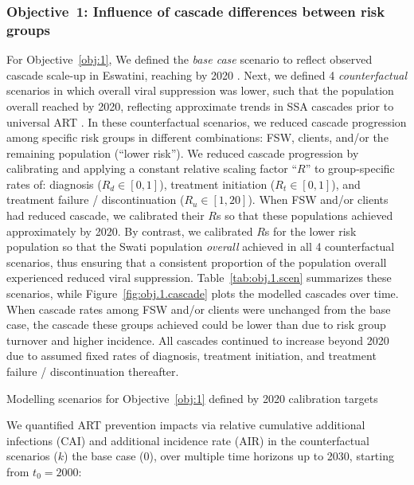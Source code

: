\subsubsection{Objective~1: Influence of cascade differences between risk groups}\label{meth.obj.1}
For Objective~\ref{obj:1},
We defined the \emph{base case} scenario to reflect
observed cascade scale-up in Eswatini, reaching \cashi by 2020 \cite{AIDSinfo}.
Next, we defined 4 \emph{counterfactual} scenarios in which overall viral suppression was lower,
such that the population overall reached \casmd by 2020,
reflecting approximate trends in SSA cascades prior to universal ART \cite{AIDSinfo}.
In these counterfactual scenarios, we reduced cascade progression
among specific risk groups in different combinations:
FSW, clients, and/or the remaining population (``lower risk'').
We reduced cascade progression by calibrating and applying
a constant relative scaling factor ``$R$'' to group-specific rates of:
diagnosis ($R_d \in [0,1]$),
treatment initiation ($R_t \in [0,1]$), and
treatment failure / discontinuation ($R_u \in [1,20]$).
When FSW and/or clients had reduced cascade, we calibrated their $R$s so that
these populations achieved approximately \caslo by 2020.
By contrast, we calibrated $R$s for the lower risk population so that
the Swati population \emph{overall} achieved \casmd in all 4 counterfactual scenarios,
thus ensuring that a consistent proportion of the population overall
experienced reduced viral suppression.
Table~\ref{tab:obj.1.scen} summarizes these scenarios, while
Figure~\ref{fig:obj.1.cascade} plots the modelled cascades over time.
When cascade rates among FSW and/or clients were unchanged from the base case,
the cascade these groups achieved could be lower than \cashi
due to risk group turnover and higher incidence.
All cascades continued to increase beyond 2020 due to assumed fixed rates of
diagnosis, treatment initiation, and treatment failure / discontinuation thereafter.
\begin{table}
  \centering
  \caption{Modelling scenarios for Objective~\ref{obj:1} defined by 2020 calibration targets}
  \label{tab:obj.1.scen}
  
\end{table}
\par
We quantified ART prevention impacts via relative
cumulative additional infections (CAI) and additional incidence rate (AIR)
in the counterfactual scenarios ($k$) \vs the base case ($0$),
over multiple time horizons up to 2030, starting from $t_0 = 2000$:

